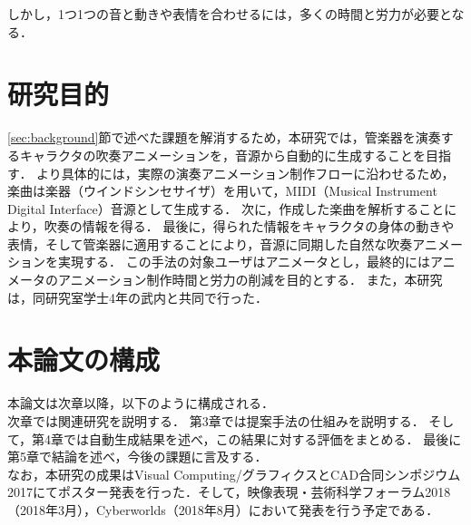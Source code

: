 しかし，1つ1つの音と動きや表情を合わせるには，多くの時間と労力が必要となる．

\section{研究目的}\label{sec:purpose}
\indent
\ref{sec:background}節で述べた課題を解消するため，本研究では，管楽器を演奏するキャラクタの吹奏アニメーションを，音源から自動的に生成することを目指す．
より具体的には，実際の演奏アニメーション制作フローに沿わせるため，楽曲は楽器（ウインドシンセサイザ）を用いて，MIDI（Musical Instrument Digital Interface）音源として生成する．
次に，作成した楽曲を解析することにより，吹奏の情報を得る．
最後に，得られた情報をキャラクタの身体の動きや表情，そして管楽器に適用することにより，音源に同期した自然な吹奏アニメーションを実現する．
この手法の対象ユーザはアニメータとし，最終的にはアニメータのアニメーション制作時間と労力の削減を目的とする．
また，本研究は，同研究室学士4年の武内と共同で行った．

\section{本論文の構成}\label{sec:structure}
本論文は次章以降，以下のように構成される．\\
\indent
次章では関連研究を説明する．
第3章では提案手法の仕組みを説明する．
そして，第4章では自動生成結果を述べ，この結果に対する評価をまとめる．
最後に第5章で結論を述べ，今後の課題に言及する．\\
\indent
なお，本研究の成果はVisual Computing/グラフィクスとCAD合同シンポジウム2017にてポスター発表\cite{vc}を行った．そして，映像表現・芸術科学フォーラム2018（2018年3月），Cyberworlds（2018年8月）において発表を行う予定である．